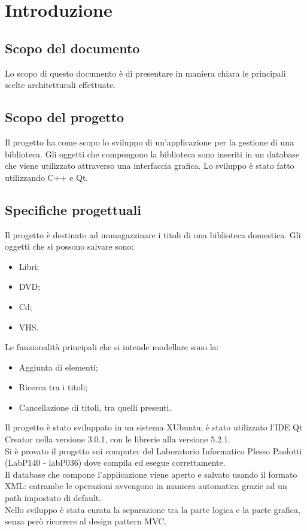 \section{Introduzione}{
	\subsection{Scopo del documento}{
		Lo scopo di questo documento è di presentare in maniera chiara le principali scelte architetturali effettuate.
	}
	\subsection{Scopo del progetto}{
		Il progetto ha come scopo lo sviluppo di un'applicazione per la gestione di una biblioteca. Gli oggetti che compongono la biblioteca sono inseriti in un database che viene utilizzato attraverso una interfaccia grafica.
		Lo sviluppo è stato fatto utilizzando C++ e Qt. 
	}
	\subsection{Specifiche progettuali}{
		Il progetto è destinato ad immagazzinare i titoli di una biblioteca domestica. Gli oggetti che si possono salvare sono:
		\begin{itemize}\itemsep0.5pt
			\item Libri;
			\item DVD;
			\item Cd;
			\item VHS.
		\end{itemize}
		Le funzionalità principali che si intende modellare sono la:
		\begin{itemize}\itemsep0.5pt
			\item Aggiunta di elementi;
			\item Ricerca tra i titoli;
			\item Cancellazione di titoli, tra quelli presenti.
		\end{itemize}
		Il progetto è stato sviluppato in un sistema XUbuntu; è stato utilizzato l'IDE Qt Creator nella versione 3.0.1, con le librerie alla versione 5.2.1.	\\
		Si è provato il progetto sui computer del Laboratorio Informatico Plesso Paolotti (LabP140 - labP036) dove compila ed esegue correttamente.\\
		Il database che compone l'applicazione viene aperto e salvato usando il formato XML: entrambe le operazioni avvengono in maniera automatica grazie ad un path impostato di default. \\
		Nello sviluppo è stata curata la separazione tra la parte logica e la parte grafica, senza però ricorrere  al design pattern MVC.	\\
	}
}